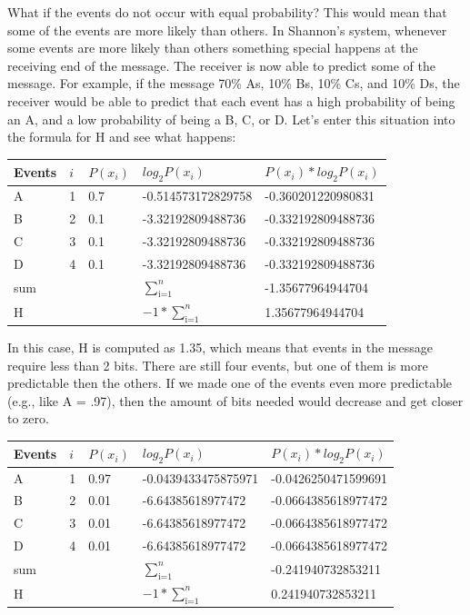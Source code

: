 \documentclass[
  oneside,
  12pt]{crumpbook}
\begin{document}
What if the events do not occur with equal probability? This would mean that some of the events are more likely than others. In Shannon's system, whenever some events are more likely than others something special happens at the receiving end of the message. The receiver is now able to predict some of the message. For example, if the message 70\% As, 10\% Bs, 10\% Cs, and 10\% Ds, the receiver would be able to predict that each event has a high probability of being an A, and a low probability of being a B, C, or D. Let's enter this situation into the formula for H and see what happens:

\begin{tabular}{l|l|l|l|l}
\hline
Events & $i$ & $P(x_i)$ & $log_2 P(x_i)$ & $P(x_i)*log_2 P(x_i)$\\
\hline
A & 1 & 0.7 & -0.514573172829758 & -0.360201220980831\\
\hline
B & 2 & 0.1 & -3.32192809488736 & -0.332192809488736\\
\hline
C & 3 & 0.1 & -3.32192809488736 & -0.332192809488736\\
\hline
D & 4 & 0.1 & -3.32192809488736 & -0.332192809488736\\
\hline
sum &  &  & $\sum_\text{i=1}^n$ & -1.35677964944704\\
\hline
H &  &  & $-1*\sum_\text{i=1}^n$ & 1.35677964944704\\
\hline
\end{tabular}

In this case, H is computed as 1.35, which means that events in the message require less than 2 bits. There are still four events, but one of them is more predictable then the others. If we made one of the events even more predictable (e.g., like A = .97), then the amount of bits needed would decrease and get closer to zero.

\begin{tabular}{l|l|l|l|l}
\hline
Events & $i$ & $P(x_i)$ & $log_2 P(x_i)$ & $P(x_i)*log_2 P(x_i)$\\
\hline
A & 1 & 0.97 & -0.0439433475875971 & -0.0426250471599691\\
\hline
B & 2 & 0.01 & -6.64385618977472 & -0.0664385618977472\\
\hline
C & 3 & 0.01 & -6.64385618977472 & -0.0664385618977472\\
\hline
D & 4 & 0.01 & -6.64385618977472 & -0.0664385618977472\\
\hline
sum &  &  & $\sum_\text{i=1}^n$ & -0.241940732853211\\
\hline
H &  &  & $-1*\sum_\text{i=1}^n$ & 0.241940732853211\\
\hline
\end{tabular}
\end{document}
